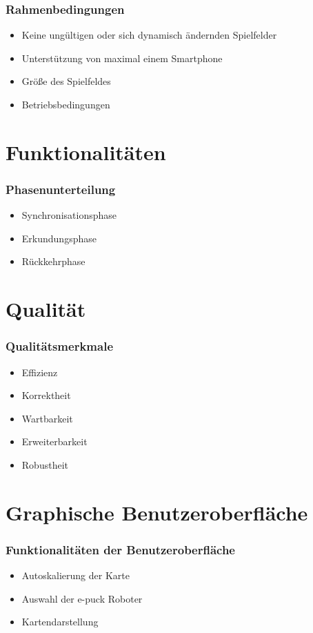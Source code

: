 \documentclass{beamer}
\begin{document}
\begin{frame}
  \frametitle{Rahmenbedingungen}
  
  	\begin{itemize}
		\item Keine ungültigen oder sich dynamisch ändernden Spielfelder
		\item Unterstützung von maximal einem Smartphone
		\item Größe des Spielfeldes
		\item Betriebsbedingungen
	\end{itemize}  
\end{frame}

\section{Funktionalitäten}
\begin{frame}
  \frametitle{Phasenunterteilung}
  
  	\begin{itemize}
		\item Synchronisationsphase
		\item Erkundungsphase
		\item Rückkehrphase
	\end{itemize}  
\end{frame}


\section{Qualität}
\begin{frame}
  \frametitle{Qualitätsmerkmale}
  
  	\begin{itemize}
		\item Effizienz
		\item Korrektheit
		\item Wartbarkeit
		\item Erweiterbarkeit
		\item Robustheit
	\end{itemize}  
\end{frame}

\section{Graphische Benutzeroberfläche}
\begin{frame}
  \frametitle{Funktionalitäten der Benutzeroberfläche}
  	\begin{itemize}
		\item Autoskalierung der Karte
		\item Auswahl der e-puck Roboter
		\item Kartendarstellung
	\end{itemize}  
\end{frame}
\end{document}
